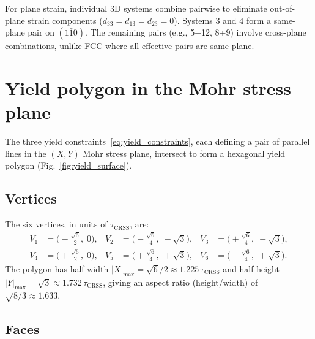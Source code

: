 \documentclass{svjour3} %
\newcommand{\tcrss}{\tau_{\mathrm{CRSS}}}
\begin{document}
For plane strain, individual 3D systems combine pairwise to eliminate
out-of-plane strain components ($d_{33} = d_{13} = d_{23} = 0$). Systems
3 and 4 form a same-plane pair on $(1\bar{1}0)$. The remaining pairs
(e.g., 5+12, 8+9) involve cross-plane combinations, unlike FCC where
all effective pairs are same-plane.

\section{Yield polygon in the Mohr stress plane}
\label{sec:yield}

The three yield constraints~\eqref{eq:yield_constraints}, each defining
a pair of parallel lines in the $(X, Y)$ Mohr stress plane, intersect to
form a hexagonal yield polygon (Fig.~\ref{fig:yield_surface}).

\subsection{Vertices}

The six vertices, in units of $\tcrss$, are:
\begin{equation}
\label{eq:vertices}
\begin{aligned}
V_1 &= \bigl(-\tfrac{\sqrt{6}}{2},\; 0\bigr), &
V_2 &= \bigl(-\tfrac{\sqrt{6}}{4},\; -\sqrt{3}\bigr), &
V_3 &= \bigl(+\tfrac{\sqrt{6}}{4},\; -\sqrt{3}\bigr), \\
V_4 &= \bigl(+\tfrac{\sqrt{6}}{2},\; 0\bigr), &
V_5 &= \bigl(+\tfrac{\sqrt{6}}{4},\; +\sqrt{3}\bigr), &
V_6 &= \bigl(-\tfrac{\sqrt{6}}{4},\; +\sqrt{3}\bigr).
\end{aligned}
\end{equation}
The polygon has half-width $|X|_{\max} = \sqrt{6}/2 \approx 1.225\,\tcrss$
and half-height $|Y|_{\max} = \sqrt{3} \approx 1.732\,\tcrss$, giving an
aspect ratio (height/width) of $\sqrt{8/3} \approx 1.633$.

\subsection{Faces}
\end{document}
